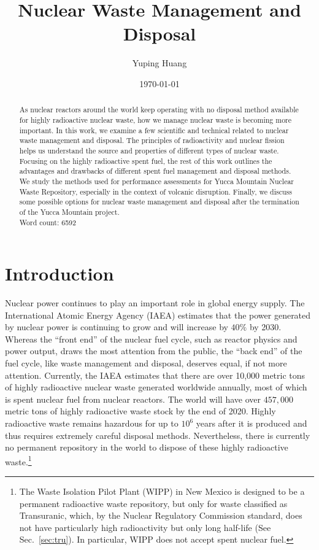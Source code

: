 \documentclass[nofootinbib,preprint,aip,pra]{revtex4-1}
\begin{document}
\title{Nuclear Waste Management and Disposal}

\author{Yuping Huang}%

\date{\today}%
\begin{abstract}
    As nuclear reactors around the world keep operating with no disposal method available for highly
    radioactive nuclear waste, how we manage nuclear waste is becoming more important. In this work,
    we examine a few scientific and technical related to nuclear waste management and disposal.
    The principles of radioactivity and nuclear fission helps us understand the source and properties
    of different types of nuclear waste. Focusing on the highly radioactive spent fuel, the rest
    of this work outlines the advantages and drawbacks of different spent fuel management and disposal
    methods. We study the methods used for performance assessments for Yucca Mountain Nuclear Waste Repository,
    especially in the context of volcanic disruption. Finally, we discuss some possible options for 
    nuclear waste management and disposal after
    the termination of the Yucca Mountain project.\\
    Word count: 6592\\
\end{abstract}
\maketitle
\tableofcontents
\newpage

\section{Introduction}
Nuclear power continues to play an important role in global energy supply.
The International Atomic Energy Agency (IAEA) estimates that the power generated by nuclear power
is continuing to grow and will increase by $40\%$ by 2030.\cite{iaea12}
Whereas the ``front end'' of the nuclear fuel cycle, such as reactor physics and power output, draws
the most attention from the public, the ``back end'' of the fuel cycle, like waste management and
disposal, deserves equal, if not more attention.
Currently, the IAEA estimates that there are over 10,000 metric tons of highly radioactive nuclear waste 
generated worldwide annually,
most of which is spent nuclear fuel from nuclear reactors.\cite{iaea08, r12}
The world will have over $457,000$ metric tons of highly radioactive waste stock by the end of 2020.\cite{r12}
Highly radioactive waste remains hazardous for up to $10^6$ years after it is produced and thus
requires extremely careful disposal methods.
Nevertheless, there is currently no permanent repository in the world to dispose of these highly radioactive
waste.\footnote{The Waste Isolation Pilot Plant (WIPP) in New Mexico is designed to be a permanent radioactive
    waste repository, but only
for waste classified as Transuranic, which, by the Nuclear Regulatory Commission standard, does not have particularly
high radioactivity but only long half-life (See Sec.~\ref{sec:tru}). In particular, WIPP does not accept spent nuclear
fuel.}  
\end{document}
